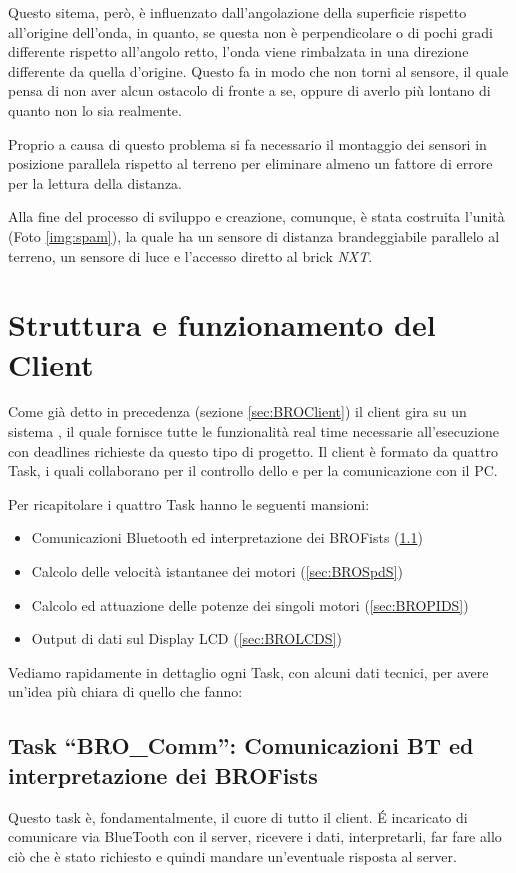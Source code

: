 Questo sitema, però, è influenzato dall'angolazione della superficie
rispetto all'origine dell'onda, in quanto, se questa non è perpendicolare o
di pochi gradi differente rispetto all'angolo retto, l'onda viene
rimbalzata in una direzione differente da quella d'origine. Questo fa in
modo che non torni al sensore, il quale pensa di non aver alcun ostacolo di
fronte a se, oppure di averlo più lontano di quanto non lo sia realmente.

Proprio a causa di questo problema si fa necessario il montaggio dei
sensori in posizione parallela rispetto al terreno per eliminare almeno un
fattore di errore per la lettura della distanza.

Alla fine del processo di sviluppo e creazione, comunque, è stata costruita
l'unità \SPAM{} (Foto \ref{img:spam}), la quale ha un sensore di distanza
brandeggiabile parallelo al terreno, un sensore di luce e l'accesso diretto
al brick \emph{NXT}.

\section{Struttura e funzionamento del Client}\label{sec:clientstru}
Come già detto in precedenza (sezione \ref{sec:BROClient}) il client
\BROFist{} gira su un sistema \nxtOSEK{}, il quale fornisce tutte le
funzionalità real time necessarie all'esecuzione con deadlines richieste da
questo tipo di progetto. Il client è formato da quattro Task, i quali
collaborano per il controllo dello \SPAM e per la comunicazione con il PC.

Per ricapitolare i quattro Task hanno le seguenti mansioni:
\begin{itemize}
    \item Comunicazioni Bluetooth ed interpretazione dei
        BROFists (\ref{sec:BROCommS})
    \item Calcolo delle velocità istantanee dei motori (\ref{sec:BROSpdS})
    \item Calcolo ed attuazione delle potenze dei singoli
        motori (\ref{sec:BROPIDS})
    \item Output di dati sul Display LCD (\ref{sec:BROLCDS})
\end{itemize}

Vediamo rapidamente in dettaglio ogni Task, con alcuni dati tecnici, per
avere un'idea più chiara di quello che fanno:

\subsection[Task ``BRO\_Comm'']{Task ``BRO\_Comm'': Comunicazioni BT ed
interpretazione dei BROFists}\label{sec:BROCommS} 
Questo task è, fondamentalmente, il cuore di tutto il client. \'E
incaricato di comunicare via BlueTooth con il server, ricevere i dati,
interpretarli, far fare allo \SPAM{} ciò che è stato richiesto e quindi
mandare un'eventuale risposta al server.

